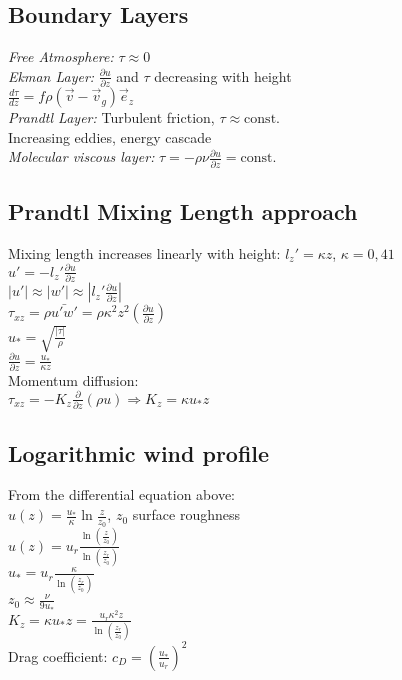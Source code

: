 \subsection*{Boundary Layers}
\textit{Free Atmosphere:} $\tau\approx 0$\\
\textit{Ekman Layer:} $\frac{\partial u}{\partial z}$ and $\tau$ decreasing with height\\
$\frac{d \tau}{dz}=f\rho(\vec{v}-\vec{v}_g)\vec{e}_z$\\
\textit{Prandtl Layer:} Turbulent friction, $\tau\approx\text{const.}$\\
Increasing eddies, energy cascade\\
\textit{Molecular viscous layer:} $\tau=-\rho\nu\frac{\partial u}{\partial z}=\text{const.}$\\
\subsection*{Prandtl Mixing Length approach}
Mixing length increases linearly with height: $l_z'=\kappa z$, $\kappa=0,41$\\
$u'=-l_z'\frac{\partial u}{\partial z}$\\
$|u'|\approx|w'|\approx|l_z'\frac{\partial u}{\partial z}|$\\
$\tau_{xz}=\rho\bar{u'w'}=\rho\kappa^2 z^2\left(\frac{\partial u}{\partial z}\right)$\\
$u_*=\sqrt{\frac{|\tau|}{\rho}}$\\
$\frac{\partial u}{\partial z}=\frac{u_*}{\kappa z}$\\
Momentum diffusion:\\
$\tau_{xz}=-K_z\frac{\partial}{\partial z}(\rho u) \Rightarrow K_z=\kappa u_* z$
\subsection*{Logarithmic wind profile}
From the differential equation above:\\
$u(z)=\frac{u_*}{\kappa}\ln{\frac{z}{z_0}}$, $z_0$ surface roughness\\
$u(z)=u_r\frac{\ln{\left(\frac{z}{z_0}\right)}}{\ln{\left(\frac{z_r}{z_0}\right)}}$\\
$u_*=u_r\frac{\kappa}{\ln{\left(\frac{z_r}{z_0}\right)}}$\\
$z_0\approx\frac{\nu}{9u_*}$\\
$K_z = \kappa u_* z = \frac{u_r\kappa^2 z}{\ln{\left(\frac{z_r}{z_0}\right)}}$\\
Drag coefficient: $c_D = \left(\frac{u_*}{u_r}\right)^2$\\
